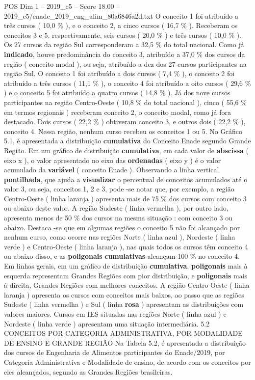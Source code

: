 \begin{textsample}{POS Dim 1 – 2019\_c5 – Score 18.00 – 2019\_c5/enade\_2019\_eng\_alim\_80a6846a2d.txt}
O conceito 1 foi atribuído a três cursos ( 10,0 \% ), e o conceito 2, a cinco cursos ( 16,7 \% ).
Receberam os conceitos 3 e 5, respectivamente, seis cursos ( 20,0 \% ) e três cursos ( 10,0 \% ).
Os 27 cursos da região Sul corresponderam a 32,5 \% do total nacional.
Como já \textbf{indicado}, houve predominância do conceito 3, atribuído a 37,0 \% dos cursos da região ( conceito modal ), ou seja, atribuído a dez dos 27 cursos participantes na região Sul.
O conceito 1 foi atribuído a dois cursos ( 7,4 \% ), o conceito 2 foi atribuído a três cursos ( 11,1 \% ), o conceito 4 foi atribuído a oito cursos ( 29,6 \% ) e o conceito 5 foi atribuído a quatro cursos ( 14,8 \% ).
Já dos nove cursos participantes na região Centro-Oeste ( 10,8 \% do total nacional ), cinco ( 55,6 \% em termos regionais ) receberam conceito 2, o conceito modal, como já fora destacado.
Dois cursos ( 22,2 \% ) obtiveram conceito 3, e outros dois ( 22,2 \% ), conceito 4.
Nessa região, nenhum curso recebeu os conceitos 1 ou 5.
No Gráfico 5.1, é apresentada a distribuição \textbf{cumulativa} do Conceito Enade segundo Grande Região.
Em um gráfico de distribuição \textbf{cumulativa}, em cada valor de \textbf{abscissa} ( eixo x ), o valor apresentado no eixo das \textbf{ordenadas} ( eixo y ) é o valor acumulado da \textbf{variável} ( conceito Enade ).
Observando a linha vertical \textbf{pontilhada}, que ajuda a \textbf{visualizar} o percentual de conceitos acumulados até o valor 3, ou seja, conceitos 1, 2 e 3, pode -se notar que, por exemplo, a região Centro-Oeste ( linha laranja ) apresenta mais de 75 \% dos cursos com conceito 3 ou abaixo deste valor.
A região Sudeste ( linha vermelha ), por outro lado, apresenta menos de 50 \% dos cursos na mesma situação : com conceito 3 ou abaixo.
Destaca -se que em algumas regiões o conceito 5 não foi alcançado por nenhum curso, como ocorre nas regiões Norte ( linha azul ), Nordeste ( linha verde ) e Centro-Oeste ( linha laranja ), nas quais todos os cursos têm conceito 4 ou abaixo disso, e as \textbf{poligonais} \textbf{cumulativas} alcançam 100 \% no conceito 4.
Em linhas gerais, em um gráfico de distribuição \textbf{cumulativa}, \textbf{poligonais} mais à esquerda representam Grandes Regiões com pior distribuição, e \textbf{poligonais} mais à direita, Grandes Regiões com melhores conceitos.
A região Centro-Oeste ( linha laranja ) apresenta os cursos com conceitos mais baixos, ao passo que as regiões Sudeste ( linha vermelha ) e Sul ( linha \textbf{rosa} ) apresentam as distribuições com valores maiores.
Cursos em IES situadas nas regiões Norte ( linha azul ) e Nordeste ( linha verde ) apresentam uma situação intermediária. 5.2 CONCEITOS POR CATEGORIA ADMINISTRATIVA, POR MODALIDADE DE ENSINO E GRANDE REGIÃO Na Tabela 5.2, é apresentada a distribuição dos cursos de Engenharia de Alimentos participantes do Enade/2019, por Categoria Administrativa e Modalidade de ensino, de acordo com os conceitos por eles alcançados, segundo as Grandes Regiões brasileiras.

\end{textsample}
